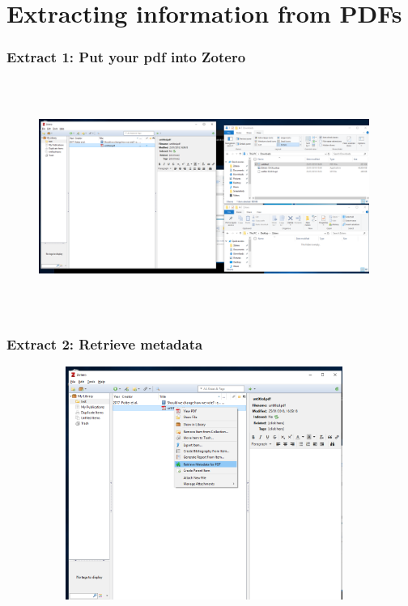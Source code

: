 \documentclass[12pt]{beamer}
\begin{document}
\section{Extracting information from PDFs}

\begin{frame} \frametitle{Extract 1: Put your pdf into Zotero} \begin{figure}[!h] \centering
	\includegraphics[height=3in, width = 4.25in,keepaspectratio]{zotero/extract_1.png}
\end{figure} \end{frame}

\begin{frame} \frametitle{Extract 2: Retrieve metadata} \begin{figure}[!h] \centering
	\includegraphics[height=3in, width = 4.25in,keepaspectratio]{zotero/extract_2.png}
\end{figure} \end{frame}
\end{document}
